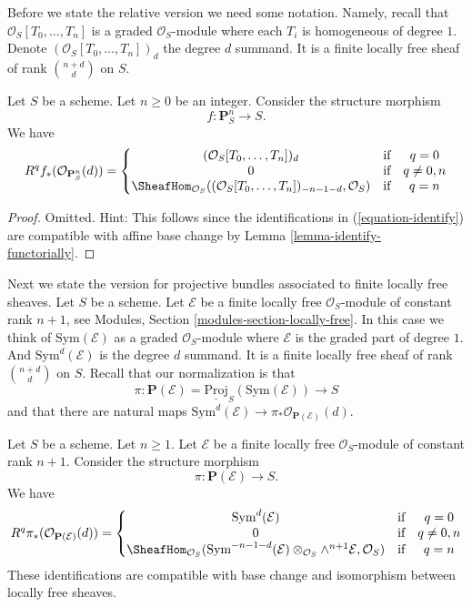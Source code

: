\noindent
Before we state the relative version we need some notation.
Namely, recall that $\mathcal{O}_S[T_0, \ldots, T_n]$ is a graded
$\mathcal{O}_S$-module where each $T_i$ is homogeneous of degree $1$.
Denote $(\mathcal{O}_S[T_0, \ldots, T_n])_d$ the degree $d$ summand.
It is a finite locally free sheaf of rank $\binom{n + d}{d}$ on $S$.

\begin{lemma}
\label{lemma-cohomology-projective-space-over-base}
Let $S$ be a scheme.
Let $n \geq 0$ be an integer.
Consider the structure morphism
$$
f : \mathbf{P}^n_S \longrightarrow S.
$$
We have
$$
R^qf_*(\mathcal{O}_{\mathbf{P}^n_S}(d)) =
\left\{
\begin{matrix}
(\mathcal{O}_S[T_0, \ldots, T_n])_d & \text{if} & q = 0 \\
0 & \text{if} & q \not = 0, n \\
\SheafHom_{\mathcal{O}_S}(
(\mathcal{O}_S[T_0, \ldots, T_n])_{- n - 1 - d}, \mathcal{O}_S)
& \text{if} & q = n
\end{matrix}
\right.
$$
\end{lemma}

\begin{proof}
Omitted. Hint: This follows since the identifications in
(\ref{equation-identify}) are compatible with affine base change
by Lemma \ref{lemma-identify-functorially}.
\end{proof}

\noindent
Next we state the version for projective bundles associated to finite locally
free sheaves. Let $S$ be a scheme. Let $\mathcal{E}$ be a finite locally
free $\mathcal{O}_S$-module of constant rank $n + 1$, see
Modules, Section \ref{modules-section-locally-free}.
In this case we think of $\text{Sym}(\mathcal{E})$ as a graded
$\mathcal{O}_S$-module where $\mathcal{E}$ is the graded part of degree $1$.
And $\text{Sym}^d(\mathcal{E})$ is the degree $d$ summand.
It is a finite locally free sheaf of rank $\binom{n + d}{d}$ on $S$.
Recall that our normalization is that
$$
\pi :
\mathbf{P}(\mathcal{E})
=
\underline{\text{Proj}}_S(\text{Sym}(\mathcal{E}))
\longrightarrow
S
$$
and that there are natural maps
$\text{Sym}^d(\mathcal{E}) \to \pi_*\mathcal{O}_{\mathbf{P}(\mathcal{E})}(d)$.

\begin{lemma}
\label{lemma-cohomology-projective-bundle}
Let $S$ be a scheme. Let $n \geq 1$.
Let $\mathcal{E}$ be a finite locally
free $\mathcal{O}_S$-module of constant rank $n + 1$.
Consider the structure morphism
$$
\pi : \mathbf{P}(\mathcal{E}) \longrightarrow S.
$$
We have
$$
R^q\pi_*(\mathcal{O}_{\mathbf{P}(\mathcal{E})}(d)) =
\left\{
\begin{matrix}
\text{Sym}^d(\mathcal{E}) & \text{if} & q = 0 \\
0 & \text{if} & q \not = 0, n \\
\SheafHom_{\mathcal{O}_S}(
\text{Sym}^{- n - 1 - d}(\mathcal{E})
\otimes_{\mathcal{O}_S}
\wedge^{n + 1}\mathcal{E},
\mathcal{O}_S)
& \text{if} & q = n
\end{matrix}
\right.
$$
These identifications are compatible with base change and
isomorphism between locally free sheaves.
\end{lemma}

